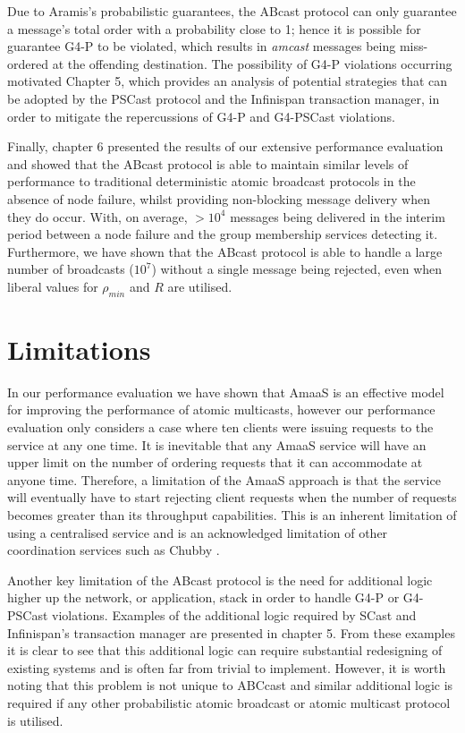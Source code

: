 Due to \textsf{Aramis}'s probabilistic guarantees, the \textsf{ABcast} protocol can only guarantee a message's total order with a probability close to 1; hence it is possible for guarantee G4-P to be violated, which results in \emph{amcast} messages being miss-ordered at the offending destination.  The possibility of G4-P violations occurring motivated Chapter 5, which provides an analysis of potential strategies that can be adopted by the \textsf{PSCast} protocol and the Infinispan transaction manager, in order to mitigate the repercussions of G4-P and G4-PSCast violations.  

Finally, chapter 6 presented the results of our extensive performance evaluation and showed that the \textsf{ABcast} protocol is able to maintain similar levels of performance to traditional deterministic atomic broadcast protocols in the absence of node failure, whilst providing non-blocking message delivery when they do occur.  With, on average, $> 10^4$ messages being delivered in the interim period between a node failure and the group membership services detecting it.  Furthermore, we have shown that the \textsf{ABcast} protocol is able to handle a large number of broadcasts ($10^7$) without a single message being rejected, even when liberal values for $\rho_{min}$ and $R$ are utilised.  

\section{Limitations}\label{sec:sum_limitations}
In our performance evaluation we have shown that \textsf{AmaaS} is an effective model for improving the performance of atomic multicasts, however our performance evaluation only considers a case where ten clients were issuing requests to the service at any one time.  It is inevitable that any \textsf{AmaaS} service will have an upper limit on the number of ordering requests that it can accommodate at anyone time.  Therefore, a limitation of the \textsf{AmaaS} approach is that the service will eventually have to start rejecting client requests when the number of requests becomes greater than its throughput capabilities.  This is an inherent limitation of using a centralised service and is an acknowledged limitation of other coordination services such as Chubby \citep{Burrows:2006:CLS:1298455.1298487}.  

Another key limitation of the \textsf{ABcast} protocol is the need for additional logic higher up the network, or application, stack in order to handle G4-P or G4-PSCast violations.  Examples of the additional logic required by \textsf{SCast} and Infinispan's transaction manager are presented in chapter 5.  From these examples it is clear to see that this additional logic can require substantial redesigning of existing systems and is often far from trivial to implement.  However, it is worth noting that this problem is not unique to \textsf{ABCcast} and similar additional logic is required if any other probabilistic atomic broadcast or atomic multicast protocol is utilised.  

